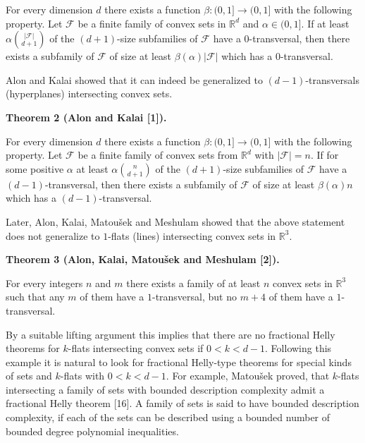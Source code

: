 \documentclass[10pt,a4paper]{amsart}
\begin{document}
For every dimension $d$ there exists a function $\beta\colon(0,1]\to(0,1]$ with the following property. Let $\mathcal{F}$ be a finite family of convex sets in $\mathbb{R}^{d}$ and $\alpha\in(0,1]$. If at least $\alpha\binom{|\mathcal{F}|}{d+1}$ of the $(d+1)$-size subfamilies of $\mathcal{F}$ have a $0$-transversal, then there exists a subfamily of $\mathcal{F}$ of size at least $\beta(\alpha)|\mathcal{F}|$ which has a $0$-transversal.
\par
\par
\par
Alon and Kalai showed that it can indeed be generalized to $(d-1)$-transversals (hyperplanes) intersecting convex sets.
\par
\par
\par\medskip\noindent\textbf{Theorem 2 (Alon and Kalai [1]).}\par
For every dimension $d$ there exists a function $\beta\colon(0,1]\to(0,1]$ with the following property. Let $\mathcal{F}$ be a finite family of convex sets from $\mathbb{R}^{d}$ with $|\mathcal{F}|=n$. If for some positive $\alpha$ at least $\alpha\binom{n}{d+1}$ of the $(d+1)$-size subfamilies of $\mathcal{F}$ have a $(d-1)$-transversal, then there exists a subfamily of $\mathcal{F}$ of size at least $\beta(\alpha)n$ which has a $(d-1)$-transversal.
\par
\par
\par
Later, Alon, Kalai, Matoušek and Meshulam showed that the above statement does not generalize to $1$-flats (lines) intersecting convex sets in $\mathbb{R}^{3}$.
\par
\par
\par\medskip\noindent\textbf{Theorem 3 (Alon, Kalai, Matoušek and Meshulam [2]).}\par
For every integers $n$ and $m$ there exists a family of at least $n$ convex sets in $\mathbb{R}^{3}$ such that any $m$ of them have a $1$-transversal, but no $m+4$ of them have a $1$-transversal.
\par
\par
\par
By a suitable lifting argument this implies that there are no fractional Helly theorems for $k$-flats intersecting convex sets if $0<k<d-1$. Following this example it is natural to look for fractional Helly-type theorems for special kinds of sets and $k$-flats with $0<k<d-1$. For example, Matoušek proved, that $k$-flats intersecting a family of sets with bounded description complexity admit a fractional Helly theorem [16]. A family of sets is said to have bounded description complexity, if each of the sets can be described using a bounded number of bounded degree polynomial inequalities.
\end{document}
